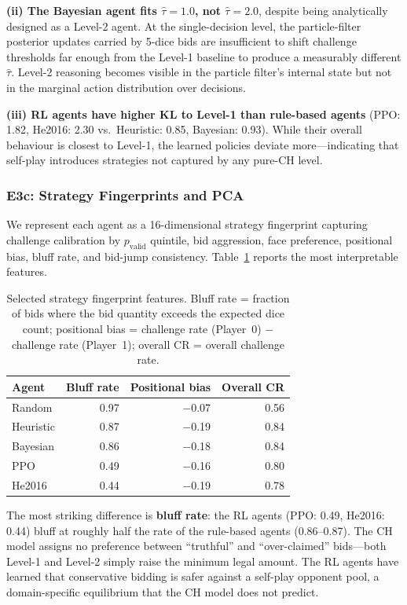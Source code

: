\documentclass{article}
\begin{document}
\textbf{(ii) The Bayesian agent fits $\hat{\tau} = 1.0$, not $\hat{\tau} = 2.0$}, despite
being analytically designed as a Level-2 agent.  At the single-decision level, the particle-filter
posterior updates carried by 5-dice bids are insufficient to shift challenge thresholds far
enough from the Level-1 baseline to produce a measurably different $\hat{\tau}$.  Level-2
reasoning becomes visible in the particle filter's internal state but not in the marginal
action distribution over decisions.

\textbf{(iii) RL agents have higher KL to Level-1 than rule-based agents} (PPO: 1.82,
He2016: 2.30 vs.\ Heuristic: 0.85, Bayesian: 0.93).  While their overall behaviour is
closest to Level-1, the learned policies deviate more---indicating that self-play introduces
strategies not captured by any pure-CH level.

\subsubsection{E3c: Strategy Fingerprints and PCA}

We represent each agent as a 16-dimensional strategy fingerprint capturing challenge
calibration by $p_{\text{valid}}$ quintile, bid aggression, face preference, positional
bias, bluff rate, and bid-jump consistency.  Table~\ref{tab:rq3_fingerprints} reports
the most interpretable features.

\begin{table}[h]
\centering
\caption{Selected strategy fingerprint features.  Bluff rate = fraction of bids where
the bid quantity exceeds the expected dice count; positional bias = challenge rate
(Player~0) $-$ challenge rate (Player~1); overall CR = overall challenge rate.}
\label{tab:rq3_fingerprints}
\begin{tabular}{lrrr}
\toprule
Agent & Bluff rate & Positional bias & Overall CR \\
\midrule
Random    & 0.97 & $-$0.07 & 0.56 \\
Heuristic & 0.87 & $-$0.19 & 0.84 \\
Bayesian  & 0.86 & $-$0.18 & 0.84 \\
PPO       & 0.49 & $-$0.16 & 0.80 \\
He2016    & 0.44 & $-$0.19 & 0.78 \\
\bottomrule
\end{tabular}
\end{table}

The most striking difference is \textbf{bluff rate}: the RL agents (PPO: 0.49, He2016: 0.44)
bluff at roughly half the rate of the rule-based agents (0.86--0.87).  The CH model assigns no
preference between ``truthful'' and ``over-claimed'' bids---both Level-1 and Level-2 simply
raise the minimum legal amount.  The RL agents have learned that conservative bidding is safer
against a self-play opponent pool, a domain-specific equilibrium that the CH model does not
predict.
\end{document}
